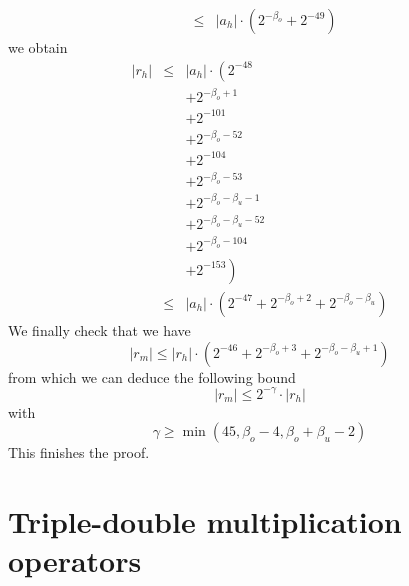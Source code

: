 \documentclass[a4paper,10pt,twoside]{article}
\newenvironment{proof}[1][Proof]{\begin{trivlist}
\item[\hskip \labelsep {\bfseries #1}]}{\end{trivlist}}
\newcommand{\qed}{\nobreak \ifvmode \relax \else \ifdim \lastskip<1.5em \hskip-\lastskip
\hskip1.5em plus0em minus0.5em \fi \nobreak \vrule height0.75em width0.5em depth0.25em\fi}
\newcommand{\hi}{\ensuremath{\mathit{h}}}
\newcommand{\mi}{\ensuremath{\mathit{m}}}
\begin{document}
\begin{proof}
\begin{eqnarray*}
& \leq & \left \vert a_\hi \right \vert \cdot \left( 2^{-\beta_o} + 2^{-49} \right)
\end{eqnarray*}
we obtain
\begin{eqnarray*}
\left \vert r_\hi \right \vert & \leq & \left \vert a_\hi \right \vert \cdot 
\left( 2^{-48} \right. \\
& & + 2^{-\beta_o+1} \\
& & + 2^{-101} \\
& & + 2^{-\beta_o-52} \\
& & + 2^{-104} \\
& & + 2^{-\beta_o-53} \\
& & + 2^{-\beta_o-\beta_u-1} \\
& & + 2^{-\beta_o-\beta_u-52} \\
& & + 2^{-\beta_o-104} \\
& & \left. + 2^{-153} \right) \\
& \leq & \left \vert a_\hi \right \vert \cdot 
\left( 2^{-47} + 2^{-\beta_o+2} + 2^{-\beta_o-\beta_u} \right)
\end{eqnarray*}
We finally check that we have
$$\left \vert r_\mi \right \vert \leq \left \vert r_\hi \right \vert \cdot \left( 2^{-46} + 2^{-\beta_o+3} + 2^{-\beta_o-\beta_u+1} \right)$$
from which we can deduce the following bound 
$$\left \vert r_\mi \right \vert \leq 2^{-\gamma} \cdot \left \vert r_\hi \right \vert$$
with
$$\gamma \geq \min\left( 45, \beta_o-4, \beta_o+\beta_u-2 \right)$$
This finishes the proof.\qed
\end{proof}
\section{Triple-double multiplication operators}
\end{document}

